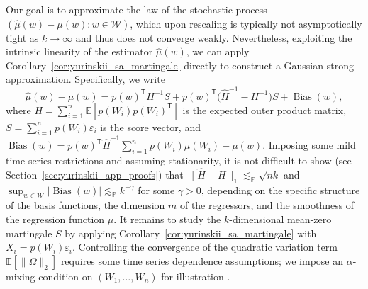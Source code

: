 \documentclass[11pt,lof]{puthesis}
\renewcommand{\P}{\ensuremath{\mathbb{P}}}
\newcommand{\E}{\ensuremath{\mathbb{E}}}
\newcommand{\cW}{\ensuremath{\mathcal{W}}}
\newcommand{\T}{\ensuremath{\mathsf{T}}}
\DeclareMathOperator{\Bias}{Bias}
\theoremstyle{break}
\theoremstyle{proof}
\begin{document}
Our goal is to approximate the law of the stochastic process
$(\hat\mu(w)-\mu(w):w\in\cW)$, which upon rescaling is typically not
asymptotically tight as $k \to \infty$ and thus does not converge weakly.
Nevertheless, exploiting the intrinsic linearity of the estimator $\hat\mu(w)$,
we can apply Corollary~\ref{cor:yurinskii_sa_martingale} directly to construct
a Gaussian
strong approximation. Specifically, we write
%
\begin{equation*}
\hat\mu(w) - \mu(w)
= p(w)^\T H^{-1} S
+ p(w)^\T \big(\hat H^{-1} - H^{-1}\big) S
+ \Bias(w),
\end{equation*}
%
where $H= \sum_{i=1}^n \E\left[p(W_i) p(W_i)^\T\right]$
is the expected outer product matrix, $S = \sum_{i=1}^n p(W_i) \varepsilon_i$
is the score vector, and
$\Bias(w) = p(w)^{\T} \hat H^{-1}\sum_{i=1}^n p(W_i) \mu(W_i) - \mu(w)$.
Imposing some mild time series restrictions and assuming stationarity,
it is not difficult to show
(see Section~\ref{sec:yurinskii_app_proofs})
that $\|\hat H - H\|_1 \lesssim_\P \sqrt{n k}$ and
$\sup_{w\in\cW} |\Bias(w)| \lesssim_\P k^{-\gamma}$
for some $\gamma>0$, depending on the specific structure of the basis
functions, the dimension $m$ of the regressors, and the smoothness of the
regression function $\mu$. It remains to study the $k$-dimensional
mean-zero martingale $S$ by applying
Corollary~\ref{cor:yurinskii_sa_martingale} with
$X_i=p(W_i) \varepsilon_i$. Controlling the convergence of the quadratic
variation term $\E[\|\Omega\|_2]$ requires some time series dependence
assumptions; we impose an $\alpha$-mixing condition on $(W_1, \ldots, W_n)$ for
illustration \citep{bradley2005basic}.
\end{document}
